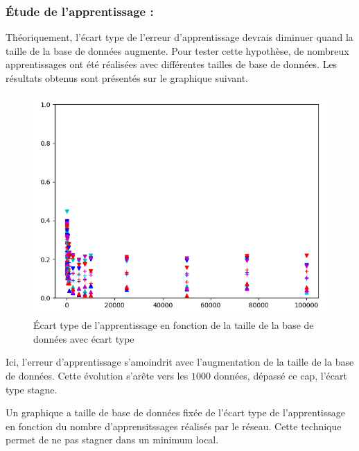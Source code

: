 \subsubsection{Étude de l'apprentissage :}\label{subsubsec:app}
Théoriquement, l'écart type de l'erreur d'apprentissage devrais
diminuer quand la taille de la base de données augmente.
Pour tester cette hypothèse, de nombreux apprentissages ont été réalisées avec
différentes tailles de base de données.
Les résultats obtenus sont présentés sur le graphique suivant.
\begin{figure}[H]
    \center
    \includegraphics[height=\moyen]{pict/appfd.png}
	\caption{Écart type de l'apprentissage en fonction de la taille de la base de données avec écart type}
	\label{fig:etfdata2graph}
\end{figure}
\vspace{-5pt}
Ici, l'erreur d'apprentissage s'amoindrit avec l'augmentation de la taille de la base de données.
Cette évolution s'arête vers les $1000$ données, dépassé ce cap, l'écart type stagne.


Un graphique a taille de base de données fixée de l'écart type de l'apprentissage
en fonction du nombre d'apprensitssages réalisés par le réseau.
Cette technique permet de ne pas stagner dans un minimum local.

